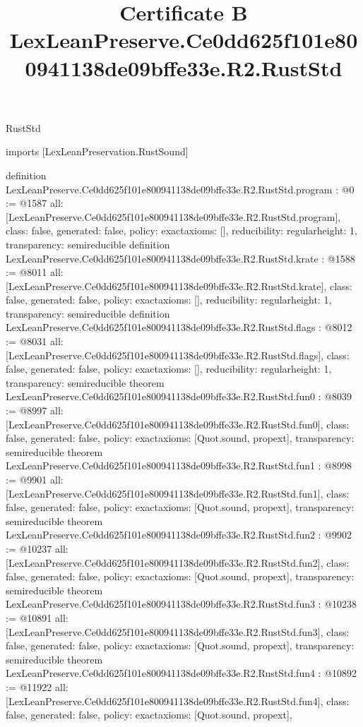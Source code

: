 \begin{lexlean}{RustStd}
\title{Certificate B LexLeanPreserve.Ce0dd625f101e800941138de09bffe33e.R2.RustStd}
\begin{coremodule}
imports [LexLeanPreservation.RustSound]

definition LexLeanPreserve.Ce0dd625f101e800941138de09bffe33e.R2.RustStd.program : @0 := @1587 {
  all: [LexLeanPreserve.Ce0dd625f101e800941138de09bffe33e.R2.RustStd.program],
  class: false,
  generated: false,
  policy: exact{axioms: []},
  reducibility: regular{height: 1},
  transparency: semireducible
}
definition LexLeanPreserve.Ce0dd625f101e800941138de09bffe33e.R2.RustStd.krate : @1588 := @8011 {
  all: [LexLeanPreserve.Ce0dd625f101e800941138de09bffe33e.R2.RustStd.krate],
  class: false,
  generated: false,
  policy: exact{axioms: []},
  reducibility: regular{height: 1},
  transparency: semireducible
}
definition LexLeanPreserve.Ce0dd625f101e800941138de09bffe33e.R2.RustStd.flags : @8012 := @8031 {
  all: [LexLeanPreserve.Ce0dd625f101e800941138de09bffe33e.R2.RustStd.flags],
  class: false,
  generated: false,
  policy: exact{axioms: []},
  reducibility: regular{height: 1},
  transparency: semireducible
}
theorem LexLeanPreserve.Ce0dd625f101e800941138de09bffe33e.R2.RustStd.fun0 : @8039 := @8997 {
  all: [LexLeanPreserve.Ce0dd625f101e800941138de09bffe33e.R2.RustStd.fun0],
  class: false,
  generated: false,
  policy: exact{axioms: [Quot.sound, propext]},
  transparency: semireducible
}
theorem LexLeanPreserve.Ce0dd625f101e800941138de09bffe33e.R2.RustStd.fun1 : @8998 := @9901 {
  all: [LexLeanPreserve.Ce0dd625f101e800941138de09bffe33e.R2.RustStd.fun1],
  class: false,
  generated: false,
  policy: exact{axioms: [Quot.sound, propext]},
  transparency: semireducible
}
theorem LexLeanPreserve.Ce0dd625f101e800941138de09bffe33e.R2.RustStd.fun2 : @9902 := @10237 {
  all: [LexLeanPreserve.Ce0dd625f101e800941138de09bffe33e.R2.RustStd.fun2],
  class: false,
  generated: false,
  policy: exact{axioms: [Quot.sound, propext]},
  transparency: semireducible
}
theorem LexLeanPreserve.Ce0dd625f101e800941138de09bffe33e.R2.RustStd.fun3 : @10238 := @10891 {
  all: [LexLeanPreserve.Ce0dd625f101e800941138de09bffe33e.R2.RustStd.fun3],
  class: false,
  generated: false,
  policy: exact{axioms: [Quot.sound, propext]},
  transparency: semireducible
}
theorem LexLeanPreserve.Ce0dd625f101e800941138de09bffe33e.R2.RustStd.fun4 : @10892 := @11922 {
  all: [LexLeanPreserve.Ce0dd625f101e800941138de09bffe33e.R2.RustStd.fun4],
  class: false,
  generated: false,
  policy: exact{axioms: [Quot.sound, propext]},
}
\end{coremodule}
\end{lexlean}
